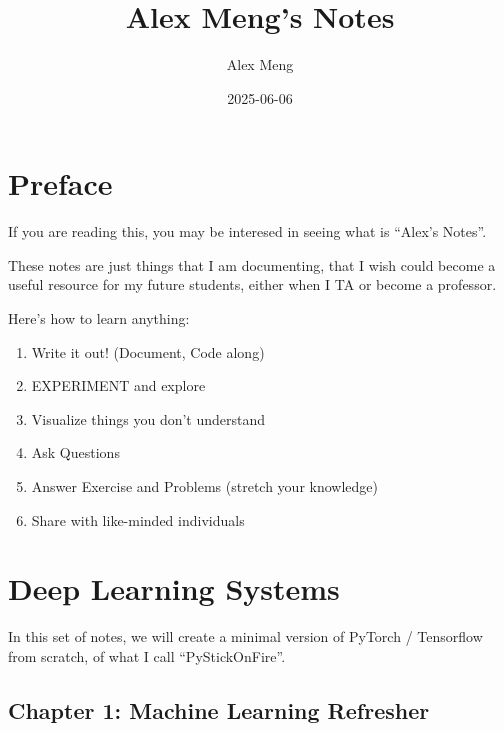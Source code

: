 \documentclass[
  letterpaper,
  DIV=11,
  numbers=noendperiod]{scrreprt}
\title{Alex Meng's Notes}
\author{Alex Meng}
\date{2025-06-06}
\providecommand{\tightlist}{%
  \setlength{\itemsep}{0pt}\setlength{\parskip}{0pt}}
\renewcommand*\contentsname{Table of contents}
\newcommand\contentsname{Table of contents}
\begin{document}
\maketitle

\renewcommand*\contentsname{Table of contents}
{
\hypersetup{linkcolor=}
\setcounter{tocdepth}{2}
\tableofcontents
}


\chapter*{Preface}\label{preface}


If you are reading this, you may be interesed in seeing what is ``Alex's
Notes''.

These notes are just things that I am documenting, that I wish could
become a useful resource for my future students, either when I TA or
become a professor.

Here's how to learn anything:

\begin{enumerate}
\def\labelenumi{\arabic{enumi}.}
\tightlist
\item
  Write it out! (Document, Code along)
\item
  EXPERIMENT and explore
\item
  Visualize things you don't understand
\item
  Ask Questions
\item
  Answer Exercise and Problems (stretch your knowledge)
\item
  Share with like-minded individuals
\end{enumerate}


\chapter*{Deep Learning Systems}\label{deep-learning-systems}


In this set of notes, we will create a minimal version of PyTorch /
Tensorflow from scratch, of what I call ``PyStickOnFire''.

\section*{Chapter 1: Machine Learning
Refresher}\label{chapter-1-machine-learning-refresher}
\end{document}
